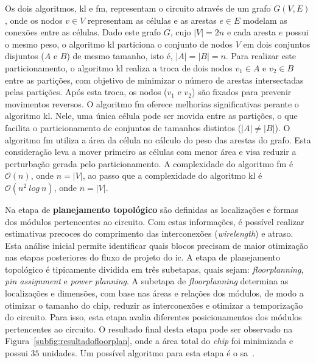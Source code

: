Os dois algoritmos, \ac{kl} e \ac{fm}, representam o circuito através de um grafo $G(V, E)$ , onde os nodos $v \in V$ representam as células e as arestas $e \in E$ modelam as conexões entre as células. Dado este grafo $G$, cujo $|V| = 2n$ e cada aresta $e$ possui o mesmo peso, o algoritmo \ac{kl} particiona o conjunto de nodos $V$ em dois conjuntos disjuntos ($A$ e $B$) de mesmo tamanho, isto é, $|A| = |B| = n$.
Para realizar este particionamento, o algoritmo \ac{kl} realiza a troca de dois nodos $v_1 \in A$ e $v_2 \in B$ entre as partições, com objetivo de minimizar o número de arestas intersectadas pelas partições. Após esta troca, os nodos ($v_1$ e $v_2$) são fixados para prevenir movimentos reversos.
O algoritmo \ac{fm} oferece melhorias significativas perante o algoritmo \ac{kl}. Nele, uma única  célula pode ser movida entre as partições, o que facilita o particionamento de conjuntos de tamanhos distintos ($|A| \neq |B|$).
O algoritmo \ac{fm} utiliza a área da célula no cálculo do peso das arestas do grafo. Esta consideração leva a mover primeiro as células com menor área e visa reduzir a perturbação gerada pelo particionamento. 
A complexidade do algoritmo \ac{fm} é $\mathcal{O}(n)$, onde $n = |V|$, ao passo que a complexidade do algoritmo \ac{kl} é $\mathcal{O}(n^2~log~n)$, onde $n = |V|$.


Na etapa de \textbf{planejamento topológico} são definidas as localizações e formas dos módulos pertencentes ao circuito.
Com estas informações, é possível realizar estimativas precoces do comprimento das interconexões (\textit{wirelength}) e atraso. 
Esta análise inicial permite identificar quais blocos precisam de maior otimização nas etapas posteriores do fluxo de projeto do \ac{ic}. 
A etapa de planejamento topológico é tipicamente dividida em três subetapas, quais sejam: \textit{floorplanning}, \textit{pin assignment} e \textit{power planning}.
A subetapa de \textit{floorplanning} determina as localizações e dimensões, com base nas áreas e relações dos módulos, de modo a otimizar o tamanho do chip, reduzir as interconexões e otimizar a temporização do circuito. Para isso, esta etapa avalia diferentes posicionamentos dos módulos pertencentes ao circuito.
O resultado final desta etapa pode ser observado na Figura~\ref{subfig:resultadofloorplan}, onde a área total do \textit{chip} foi minimizada e possui $35$ unidades.
Um possível algoritmo para esta etapa é o \ac{sa}~\cite{russell2009artificial}.

